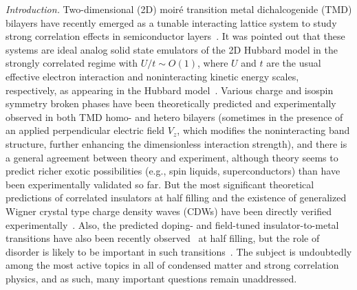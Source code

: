 \documentclass[aps,prb,twocolumn,superscriptaddress,longbibliography]{revtex4-2}
\newcommand{\anno}[1]{}
\begin{document}
\maketitle
\textit{Introduction.} Two-dimensional (2D) moir\'e transition metal dichalcogenide (TMD) bilayers have recently emerged as a tunable interacting lattice system to study strong correlation effects in semiconductor layers~\cite{regan2020mott,wang2020correlated,xu2020correlated,zhang2020flat,zhou2021bilayer,tang2020simulation,liu2021excitonic,li2021imaging,li2021continuous,li2021quantum,huang2021correlated,jin2021stripe,ghiotto2021quantum,li2021chargeorderenhanced}.\anno{[cite all good relevant experimental papers]} It was pointed out that these systems are ideal analog solid state emulators of the 2D Hubbard model in the strongly correlated regime with $U/t \sim O(1)$, where $U$ and $t$ are the usual effective electron interaction and noninteracting kinetic energy scales, respectively, as appearing in the Hubbard model~\cite{wu2018hubbard,hu2021competinga,morales-duran2021nonlocal,morales-duran2021metalinsulator,pan2020band,pan2020quantum,pan2021interactiondriven,zang2021hartreefock}. \anno{[cite the relevant papers from Texas and our three papers and the paper from Flatiron and any other relevant and correct theory papers]}  Various charge and isospin symmetry broken phases have been theoretically predicted and experimentally observed in both TMD homo- and hetero bilayers (sometimes in the presence of an applied perpendicular electric field $V_z$, which modifies the noninteracting band structure, further enhancing the dimensionless interaction strength), and there is a general agreement between theory and experiment, although theory seems to predict richer exotic possibilities (e.g., spin liquids, superconductors) than have been experimentally validated so far.  But the most significant theoretical predictions\anno{[cite our work here]} of correlated insulators at half filling and the existence of generalized Wigner crystal type charge density waves (CDWs) have been directly verified experimentally~\cite{li2021imaging}.\anno{[cite the very recent Nature paper from Berkeley]} Also, the predicted doping- and field-tuned insulator-to-metal transitions have also been recently observed~\cite{li2021continuous,ghiotto2021quantum,pan2021interactiondriven} \anno{[cite Cornell and Columbia Nature papers, and our PRL here]} at half filling, but the role of disorder is likely to be important in such transitions~\cite{ahn2021disorder}. \anno{[cite Ahn-SDS preprint]}  The subject is undoubtedly among the most active topics in all of condensed matter and strong correlation physics, and as such, many important questions remain unaddressed.
\end{document}
